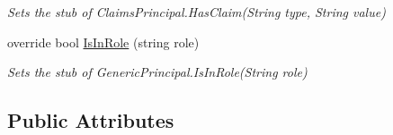 \begin{DoxyCompactItemize}
\begin{DoxyCompactList}\small\item\em Sets the stub of Claims\-Principal.\-Has\-Claim(\-String type, String value)\end{DoxyCompactList}\item 
override bool \hyperlink{class_system_1_1_security_1_1_principal_1_1_fakes_1_1_stub_generic_principal_a1e2cd628cd479b8f5c5043cf24f16e19}{Is\-In\-Role} (string role)
\begin{DoxyCompactList}\small\item\em Sets the stub of Generic\-Principal.\-Is\-In\-Role(\-String role)\end{DoxyCompactList}\end{DoxyCompactItemize}
\subsection*{Public Attributes}
